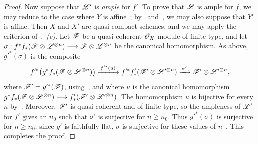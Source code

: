\begin{proof}
Now suppose that $\mathscr{L}'$ is \emph{ample} for $f'$. To prove that $\mathscr{L}$
is ample for $f$, we may reduce to the case where $Y$ is
affine~; by~
and~, we may also suppose that $Y'$ is affine.
Then $X$ and $X'$ are quasi-compact schemes, and we may apply the
criterion of~,~\emph{(c)}. Let $\mathscr{F}$ be a
quasi-coherent $\mathscr{O}_X$-module of finite type, and let $\sigma:
f^*f_*(\mathscr{F}\otimes\mathscr{L}^{\otimes n})
\longrightarrow
\mathscr{F}\otimes\mathscr{L}^{\otimes n}$
be the canonical homomorphism. As above, $g'^*(\sigma)$ is the
composite
\[
  f'^*\!\left(g^*f_*(\mathscr{F}\otimes\mathscr{L}^{\otimes n})\right)
    \xrightarrow{\,f'^*(u)\,}
  f'^*f'_*(\mathscr{F}'\otimes\mathscr{L}'^{\otimes n})
    \xrightarrow{\,\sigma'\,}
  \mathscr{F}'\otimes\mathscr{L}'^{\otimes n},
\]
where $\mathscr{F}'=g'^*(\mathscr{F})$, using~, and where
$u$ is the canonical homomorphism $g^*f_*(\mathscr{F}\otimes\mathscr{L}^{\otimes n})
\longrightarrow
f'_*(\mathscr{F}'\otimes\mathscr{L}'^{\otimes n})$.
The homomorphism $u$ is bijective for every $n$ by~.
Moreover, $\mathscr{F}'$ is quasi-coherent and of finite type, so the
ampleness of $\mathscr{L}'$ for $f'$ gives an $n_0$ such that $\sigma'$ is
surjective for $n\geq n_0$. Thus $g'^*(\sigma)$ is surjective for
$n\geq n_0$; since $g'$ is faithfully flat, $\sigma$ is surjective for
these values of $n$~. This completes the proof.
\end{proof}


